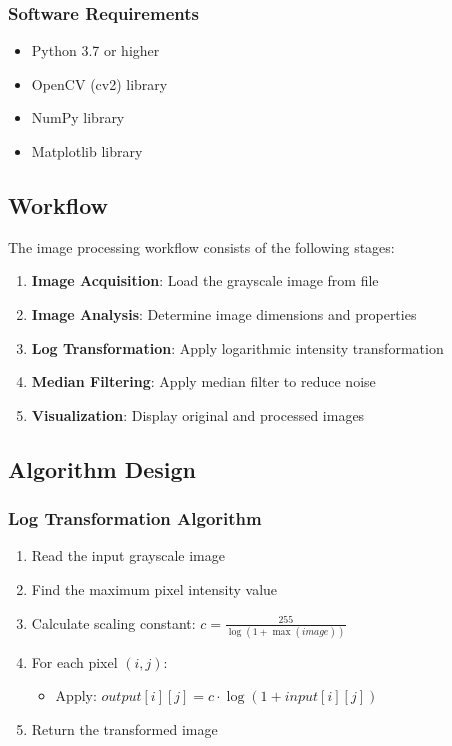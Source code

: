 \documentclass[12pt,a4paper]{article}
\begin{document}
\subsubsection{Software Requirements}
\begin{itemize}
    \item Python 3.7 or higher
    \item OpenCV (cv2) library
    \item NumPy library
    \item Matplotlib library
\end{itemize}

\subsection{Workflow}
The image processing workflow consists of the following stages:

\begin{enumerate}
    \item \textbf{Image Acquisition}: Load the grayscale image from file
    \item \textbf{Image Analysis}: Determine image dimensions and properties
    \item \textbf{Log Transformation}: Apply logarithmic intensity transformation
    \item \textbf{Median Filtering}: Apply median filter to reduce noise
    \item \textbf{Visualization}: Display original and processed images
\end{enumerate}

\subsection{Algorithm Design}

\subsubsection{Log Transformation Algorithm}
\begin{enumerate}
    \item Read the input grayscale image
    \item Find the maximum pixel intensity value
    \item Calculate scaling constant: $c = \frac{255}{\log(1 + \max(image))}$
    \item For each pixel $(i,j)$:
    \begin{itemize}
        \item Apply: $output[i][j] = c \cdot \log(1 + input[i][j])$
    \end{itemize}
    \item Return the transformed image
\end{enumerate}
\end{document}
